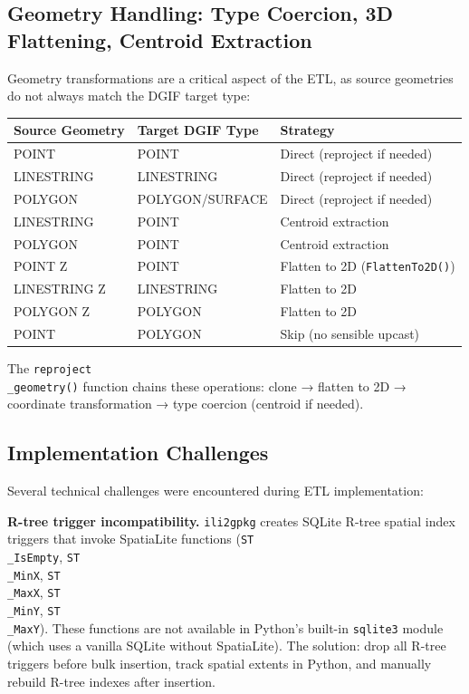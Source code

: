 \documentclass[conference]{IEEEtran}
\begin{document}
\subsection{Geometry Handling: Type Coercion, 3D Flattening, Centroid Extraction}

Geometry transformations are a critical aspect of the ETL, as source geometries do not always match the DGIF target type:

\begin{center}
\begin{longtable}{p{}p{}p{}}
Source Geometry & Target DGIF Type & Strategy \\
\midrule
POINT & POINT & Direct (reproject if needed) \\
LINESTRING & LINESTRING & Direct (reproject if needed) \\
POLYGON & POLYGON/SURFACE & Direct (reproject if needed) \\
LINESTRING & POINT & Centroid extraction \\
POLYGON & POINT & Centroid extraction \\
POINT Z & POINT & Flatten to 2D (\texttt{FlattenTo2D()}) \\
LINESTRING Z & LINESTRING & Flatten to 2D \\
POLYGON Z & POLYGON & Flatten to 2D \\
POINT & POLYGON & Skip (no sensible upcast) \\
\end{longtable}
\end{center}


The \texttt{reproject\\_geometry()} function chains these operations: clone → flatten to 2D → coordinate transformation → type coercion (centroid if needed).

\subsection{Implementation Challenges}

Several technical challenges were encountered during ETL implementation:

\textbf{R-tree trigger incompatibility.} \texttt{ili2gpkg} creates SQLite R-tree spatial index triggers that invoke SpatiaLite functions (\texttt{ST\\_IsEmpty}, \texttt{ST\\_MinX}, \texttt{ST\\_MaxX}, \texttt{ST\\_MinY}, \texttt{ST\\_MaxY}). These functions are not available in Python's built-in \texttt{sqlite3} module (which uses a vanilla SQLite without SpatiaLite). The solution: drop all R-tree triggers before bulk insertion, track spatial extents in Python, and manually rebuild R-tree indexes after insertion.
\end{document}
